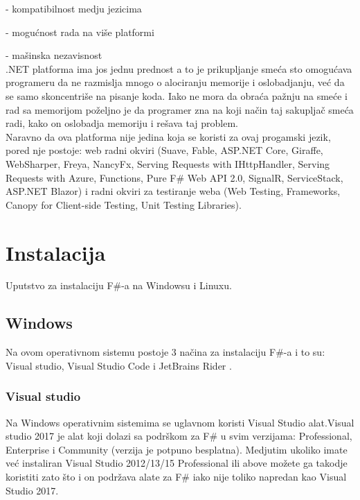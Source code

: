 \documentclass[a4paper]{article}
\begin{document}
	- kompatibilnost medju jezicima
	
	- mogućnost rada na više platformi
	
	- mašinska nezavisnost
\\


.NET platforma ima jos jednu prednost a to je prikupljanje smeća sto omogućava programeru da ne razmislja mnogo o alociranju memorije i oslobadjanju, već da se samo skoncentriše na pisanje koda. Iako ne mora da obraća pažnju na smeće i rad sa memorijom poželjno je da programer zna na koji način taj sakupljač smeća radi, kako on oslobadja memoriju i rešava taj problem.
\\

Naravno da ova platforma nije jedina koja se koristi za ovaj progamski jezik, pored nje postoje: web radni okviri (Suave, Fable, ASP.NET Core, Giraffe, WebSharper, Freya, NancyFx, Serving Requests with IHttpHandler, Serving Requests with Azure, Functions, Pure F\# Web API 2.0, SignalR, ServiceStack, ASP.NET Blazor) i radni okviri za testiranje weba (Web Testing, Frameworks, Canopy for Client-side Testing, Unit Testing Libraries)\cite{fwFs}.




\section{Instalacija}

Uputstvo za instalaciju F\#-a na Windowsu i Linuxu.

\subsection{Windows}

Na ovom operativnom sistemu postoje 3 načina za instalaciju F\#-a i to su: Visual studio\cite{vStud}, Visual Studio Code \cite{vStudCode} i JetBrains Rider \cite{jetBrains}.

\subsubsection{Visual studio}
	
Na Windows operativnim sistemima se uglavnom koristi Visual Studio alat.Visual studio 2017 je alat koji dolazi sa podrškom za F\# u svim verzijama: Professional, Enterprise i Community (verzija je potpuno besplatna). 
	Medjutim ukoliko imate  već instaliran Visual Studio 2012/13/15  Professional ili above možete ga takodje koristiti zato što i on podržava alate za F\# iako nije toliko napredan kao Visual Studio 2017.
\end{document}
